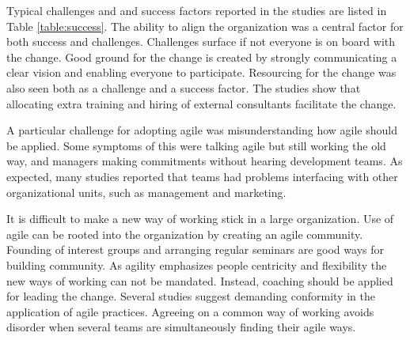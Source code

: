 \documentclass[lnbip]{svmultln}
\begin{document}
Typical challenges and and success factors reported in the studies are listed in
Table \ref{table:success}. The ability to align the organization was a central
factor for both success and challenges. Challenges surface if not everyone is on
board with the change. Good ground for the change is created by strongly
communicating a clear vision and enabling everyone to participate. Resourcing
for the change was also seen both as a challenge and a success factor.
The studies show that allocating extra training and hiring of external
consultants facilitate the change.

A particular challenge for adopting agile was misunderstanding how agile should
be applied. Some symptoms of this were talking agile but still working the old
way, and managers making commitments without hearing development teams.
As expected, many studies reported that teams had problems interfacing with
other organizational units, such as management and marketing.

It is difficult to make a new way of working stick in a large organization.
Use of agile can be rooted into the organization by creating an agile community.
Founding of interest groups and arranging regular seminars are good ways for
building community. As agility emphasizes people centricity and flexibility the
new ways of working can not be mandated. Instead, coaching should be applied for
leading the change. Several studies suggest demanding conformity in the
application of agile practices. Agreeing on a common way of working avoids
disorder when several teams are simultaneously finding their agile ways.
\end{document}
